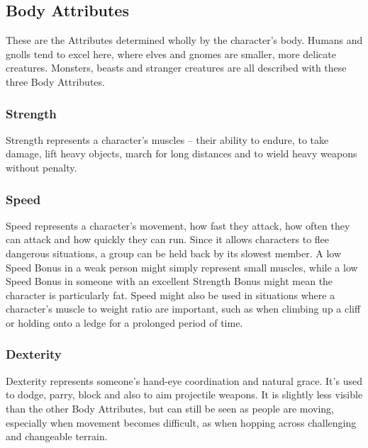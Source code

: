\begin{multicols}{2}

\subsection{Body Attributes}

These are the Attributes determined wholly by the character's body. Humans and gnolls tend to excel here, where elves and gnomes are smaller, more delicate creatures. Monsters, beasts and stranger creatures are all described with these three Body Attributes.

\subsubsection{Strength}

Strength represents a character's muscles -- their ability to endure, to take damage, lift heavy objects, march for long distances and to wield heavy weapons without penalty.

\subsubsection{Speed}

Speed represents a character's movement, how fast they attack, how often they can attack and how quickly they can run. Since it allows characters to flee dangerous situations, a group can be held back by its slowest member. A low Speed Bonus in a weak person might simply represent small muscles, while a low Speed Bonus in someone with an excellent Strength Bonus might mean the character is particularly fat. Speed might also be used in situations where a character's muscle to weight ratio are important, such as when climbing up a cliff or holding onto a ledge for a prolonged period of time.

\subsubsection{Dexterity}

Dexterity represents someone's hand-eye coordination and natural grace. It's used to dodge, parry, block and also to aim projectile weapons. It is slightly less visible than the other Body Attributes, but can still be seen as people are moving, especially when movement becomes difficult, as when hopping across challenging and changeable terrain.


\end{multicols}
